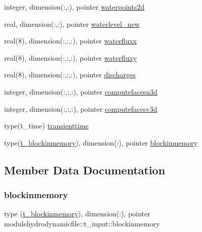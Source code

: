 \begin{DoxyCompactItemize}
\item 
integer, dimension(\+:,\+:), pointer \mbox{\hyperlink{structmodulehydrodynamicfile_1_1t__input_ab3582b36e4ed282fc898a352eaccebca}{waterpoints2d}}
\item 
real, dimension(\+:,\+:), pointer \mbox{\hyperlink{structmodulehydrodynamicfile_1_1t__input_a5a4b4c647f443f1ae1dd0cccf43c0c70}{waterlevel\+\_\+new}}
\item 
real(8), dimension(\+:,\+:,\+:), pointer \mbox{\hyperlink{structmodulehydrodynamicfile_1_1t__input_aeec79f72fd98219def3ab83fa19c1380}{waterfluxx}}
\item 
real(8), dimension(\+:,\+:,\+:), pointer \mbox{\hyperlink{structmodulehydrodynamicfile_1_1t__input_af24da4152dab8df310890427d3116bfe}{waterfluxy}}
\item 
real(8), dimension(\+:,\+:,\+:), pointer \mbox{\hyperlink{structmodulehydrodynamicfile_1_1t__input_acc04ab1e6fe76c227a9c7cdbc019b14b}{discharges}}
\item 
integer, dimension(\+:,\+:,\+:), pointer \mbox{\hyperlink{structmodulehydrodynamicfile_1_1t__input_a541745a25681fe6bae11805682191a2d}{computefacesu3d}}
\item 
integer, dimension(\+:,\+:,\+:), pointer \mbox{\hyperlink{structmodulehydrodynamicfile_1_1t__input_a8dabe2967e6afe32ff4f70ad730d98cd}{computefacesv3d}}
\item 
type(t\+\_\+time) \mbox{\hyperlink{structmodulehydrodynamicfile_1_1t__input_a9413d896a91822aba41a37df0fa45771}{transienttime}}
\item 
type(\mbox{\hyperlink{structmodulehydrodynamicfile_1_1t__blockinmemory}{t\+\_\+blockinmemory}}), dimension(\+:), pointer \mbox{\hyperlink{structmodulehydrodynamicfile_1_1t__input_a78874232104e07da2fe5607996460803}{blockinmemory}}
\end{DoxyCompactItemize}


\subsection{Member Data Documentation}
\mbox{\label{structmodulehydrodynamicfile_1_1t__input_a78874232104e07da2fe5607996460803}} 
\subsubsection{\texorpdfstring{blockinmemory}{blockinmemory}}
{\footnotesize\ttfamily type (\mbox{\hyperlink{structmodulehydrodynamicfile_1_1t__blockinmemory}{t\+\_\+blockinmemory}}), dimension(\+:), pointer modulehydrodynamicfile\+::t\+\_\+input\+::blockinmemory\hspace{0.3cm}{\ttfamily [private]}}

